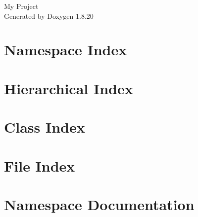 \let\mypdfximage\pdfximage\def\pdfximage{\immediate\mypdfximage}\documentclass[twoside]{book}
\newcommand{\+}{\discretionary{\mbox{\scriptsize$\hookleftarrow$}}{}{}}
\newcommand{\clearemptydoublepage}{%
  \newpage{\pagestyle{empty}\cleardoublepage}%
}
\begin{document}
\hypersetup{pageanchor=false,
             bookmarksnumbered=true,
             pdfencoding=unicode
            }
\begin{titlepage}
\vspace*{7cm}
\begin{center}%
{\Large My Project }\\
\vspace*{1cm}
{\large Generated by Doxygen 1.8.20}\\
\end{center}
\end{titlepage}
\clearemptydoublepage
{}
\tableofcontents
\clearemptydoublepage
{}
\hypersetup{pageanchor=true}

\chapter{Namespace Index}

\chapter{Hierarchical Index}

\chapter{Class Index}

\chapter{File Index}

\chapter{Namespace Documentation}


\end{document}
